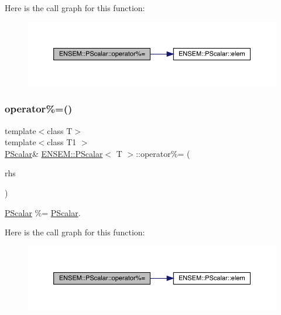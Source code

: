 Here is the call graph for this function\+:
\nopagebreak
\begin{figure}[H]
\begin{center}
\leavevmode
\includegraphics[width=350pt]{d3/d27/classENSEM_1_1PScalar_ab583ff2667eba7d2bed2acbd3c15e43e_cgraph}
\end{center}
\end{figure}
\mbox{\label{classENSEM_1_1PScalar_ab583ff2667eba7d2bed2acbd3c15e43e}} 
\subsubsection{\texorpdfstring{operator\%=()}{operator\%=()}\hspace{0.1cm}{\footnotesize\ttfamily [2/3]}}
{\footnotesize\ttfamily template$<$class T$>$ \\
template$<$class T1 $>$ \\
\mbox{\hyperlink{classENSEM_1_1PScalar}{P\+Scalar}}\& \mbox{\hyperlink{classENSEM_1_1PScalar}{E\+N\+S\+E\+M\+::\+P\+Scalar}}$<$ T $>$\+::operator\%= (\begin{DoxyParamCaption}\item[{const \mbox{\hyperlink{classENSEM_1_1PScalar}{P\+Scalar}}$<$ T1 $>$ \&}]{rhs }\end{DoxyParamCaption})\hspace{0.3cm}{\ttfamily [inline]}}



\mbox{\hyperlink{classENSEM_1_1PScalar}{P\+Scalar}} \%= \mbox{\hyperlink{classENSEM_1_1PScalar}{P\+Scalar}}. 

Here is the call graph for this function\+:
\nopagebreak
\begin{figure}[H]
\begin{center}
\leavevmode
\includegraphics[width=350pt]{d3/d27/classENSEM_1_1PScalar_ab583ff2667eba7d2bed2acbd3c15e43e_cgraph}
\end{center}
\end{figure}
\mbox{\label{classENSEM_1_1PScalar_ab583ff2667eba7d2bed2acbd3c15e43e}} 
